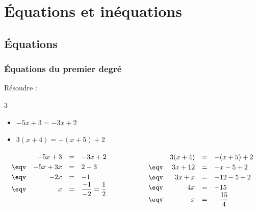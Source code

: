 \chapter{Équations et inéquations}

\section{Équations}

\subsection{Équations du premier degré}

\begin{methode}
	Résoudre :
	\begin{multicols}{3}
		\begin{itemize}
			\item $-5x + 3 = -3x + 2$
			\item $3(x + 4) = -(x + 5) + 2$
		\end{itemize}
	\end{multicols}

	\begin{correction}
		\[
			\begin{array}{ll}%
				\def\arraystretch{1.2}%
				\begin{array}{rrcl}%
					     & -5x + 3  & = & -3x + 2                       \\
					\eqv & -5x + 3x & = & 2 - 3                         \\
					\eqv & -2x      & = & -1                            \\
					\eqv & x        & = & \dfrac{-1}{-2} = \dfrac{1}{2} \\
					     &          &   &
				\end{array} \qquad & \qquad %
				\def\arraystretch{1.2}%
				\begin{array}{rrcl}%
					     & 3(x + 4) & = & -(x + 5) + 2   \\
					\eqv & 3x + 12  & = & -x - 5 + 2     \\
					\eqv & 3x + x   & = & -12 - 5 + 2    \\
					\eqv & 4x       & = & -15            \\
					\eqv & x        & = & -\dfrac{15}{4}
				\end{array}%
			\end{array}%
		\]
	\end{correction}
\end{methode}

